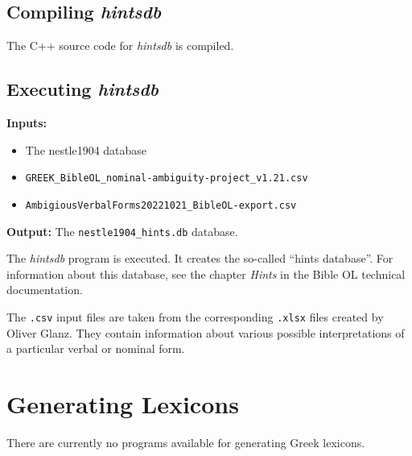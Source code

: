 \documentclass[11pt,oneside,a4paper,article]{memoir}
\begin{document}
\section{Compiling \emph{hintsdb}}

The C++ source code for \emph{hintsdb} is compiled.


\section{Executing \emph{hintsdb}}

\noindent \textbf{Inputs:}
\begin{itemize}
\item The nestle1904 database
\item \texttt{GREEK\_BibleOL\_nominal-ambiguity-project\_v1.21.csv}
\item \texttt{AmbigiousVerbalForms20221021\_BibleOL-export.csv}
\end{itemize}

\noindent \textbf{Output:} The \texttt{nestle1904\_hints.db} database.

\vspace{1ex}

\noindent
The \emph{hintsdb} program is executed. It creates the so-called ``hints database''. For information
about this database, see the chapter \emph{Hints} in the Bible OL technical documentation.

The \texttt{.csv} input files are taken from the corresponding \texttt{.xlsx} files created by
Oliver Glanz. They contain information about various possible interpretations of a particular verbal
or nominal form.



\chapter{Generating Lexicons}

There are currently no programs available for generating Greek lexicons.
\end{document}
